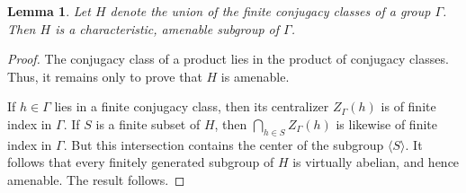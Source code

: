 \documentclass{amsart}
\theoremstyle{plain}
\newtheorem{lemma}[theorem]{Lemma}
\theoremstyle{definition}
\theoremstyle{remark}
\begin{document}
\begin{lemma}\label{lem:icc}
Let $H$ denote the union of the finite conjugacy classes of a group $\Gamma$. Then $H$
is a characteristic, amenable subgroup of $\Gamma$.
\end{lemma}
\begin{proof}
The conjugacy class of a product lies in the product of conjugacy classes. Thus, it
remains only to prove that $H$ is amenable.

If $h \in \Gamma$ lies in a finite conjugacy class, then its centralizer $Z_{\Gamma}(h)$
is of finite index in $\Gamma$. If $S$ is a finite subset of $H$, then $\bigcap_{h \in
S} Z_{\Gamma}(h)$ is likewise of finite index in $\Gamma$. But this intersection
contains the center of the subgroup $\langle S \rangle$. It follows that every finitely
generated subgroup of $H$ is virtually abelian, and hence amenable. The result follows.
\end{proof}
\end{document}
